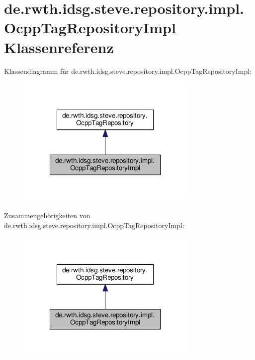 \hypertarget{classde_1_1rwth_1_1idsg_1_1steve_1_1repository_1_1impl_1_1_ocpp_tag_repository_impl}{\section{de.\-rwth.\-idsg.\-steve.\-repository.\-impl.\-Ocpp\-Tag\-Repository\-Impl Klassenreferenz}
\label{classde_1_1rwth_1_1idsg_1_1steve_1_1repository_1_1impl_1_1_ocpp_tag_repository_impl}
}


Klassendiagramm für de.\-rwth.\-idsg.\-steve.\-repository.\-impl.\-Ocpp\-Tag\-Repository\-Impl\-:\nopagebreak
\begin{figure}[H]
\begin{center}
\leavevmode
\includegraphics[width=246pt]{classde_1_1rwth_1_1idsg_1_1steve_1_1repository_1_1impl_1_1_ocpp_tag_repository_impl__inherit__graph}
\end{center}
\end{figure}


Zusammengehörigkeiten von de.\-rwth.\-idsg.\-steve.\-repository.\-impl.\-Ocpp\-Tag\-Repository\-Impl\-:\nopagebreak
\begin{figure}[H]
\begin{center}
\leavevmode
\includegraphics[width=246pt]{classde_1_1rwth_1_1idsg_1_1steve_1_1repository_1_1impl_1_1_ocpp_tag_repository_impl__coll__graph}
\end{center}
\end{figure}
